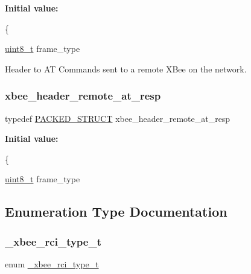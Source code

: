 {\bfseries Initial value\+:}
\begin{DoxyCode}
\{
   
   \hyperlink{group__hal__dos_gae1affc9ca37cfb624959c866a73f83c2}{uint8\_t}          frame\_type
\end{DoxyCode}


Header to AT Commands sent to a remote X\+Bee on the network. 

\mbox{\label{group__xbee__atcmd_ga3f35810cc9e8761d8865f7f53f6ffa28}} 
\subsubsection{\texorpdfstring{xbee\+\_\+header\+\_\+remote\+\_\+at\+\_\+resp}{xbee\_header\_remote\_at\_resp}}
{\footnotesize\ttfamily typedef \hyperlink{group___s_x_a_ga4233297bd31be5c273d4fb0758cc54d7}{P\+A\+C\+K\+E\+D\+\_\+\+S\+T\+R\+U\+CT} xbee\+\_\+header\+\_\+remote\+\_\+at\+\_\+resp}

{\bfseries Initial value\+:}
\begin{DoxyCode}
\{
   
   \hyperlink{group__hal__dos_gae1affc9ca37cfb624959c866a73f83c2}{uint8\_t}          frame\_type
\end{DoxyCode}


\subsection{Enumeration Type Documentation}
\mbox{\label{group__xbee__atcmd_gaa874b4a291f79f2e80f867ce71fccea5}} 
\subsubsection{\texorpdfstring{\+\_\+xbee\+\_\+rci\+\_\+type\+\_\+t}{\_xbee\_rci\_type\_t}}
{\footnotesize\ttfamily enum \hyperlink{group__xbee__atcmd_gaa874b4a291f79f2e80f867ce71fccea5}{\+\_\+xbee\+\_\+rci\+\_\+type\+\_\+t}}



